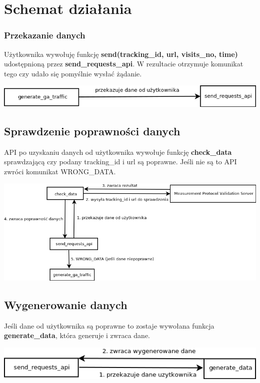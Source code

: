 \documentclass{article}
\begin{document}
\section{Schemat działania}

\subsubsection{Przekazanie danych}
Użytkownika wywołuję funkcję \textbf{send(tracking\_id, url, visits\_no, time)} udostępnioną przez \textbf{send\_requests\_api}. W rezultacie otrzymuje komunikat tego czy udało się pomyślnie wysłać żądanie.

\begin{center}\includegraphics[scale=0.5]{put_data}\end{center}

\subsection{Sprawdzenie poprawności danych}
API po uzyskaniu danych od użytkownika wywołuje funkcję \textbf{check\_data} sprawdzającą czy podany tracking\_id i url 
są poprawne. Jeśli nie są to API zwróci komunikat {WRONG\_DATA}.

\begin{center}\includegraphics[scale=0.5]{check_data}\end{center}

\subsection{Wygenerowanie danych}
Jeśli dane od użytkownika są poprawne to zostaje wywołana funkcja \textbf{generate\_data}, która generuje i zwraca dane. 

\begin{center}\includegraphics[scale=0.5]{generate_data}\end{center}
\end{document}
